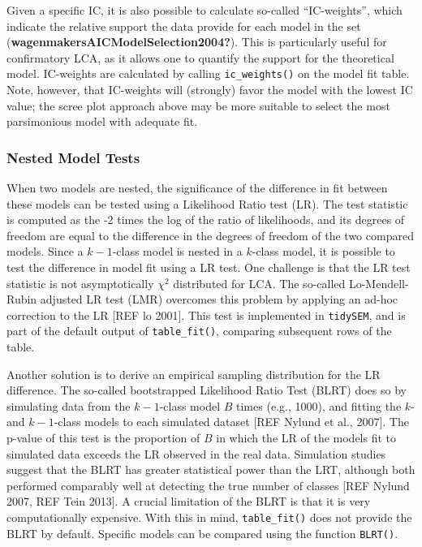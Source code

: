 \documentclass[
  ,man,floatsintext]{apa6}
\begin{document}
Given a specific IC, it is also possible to calculate so-called
``IC-weights'', which indicate the relative support the data provide for
each model in the set (\textbf{wagenmakersAICModelSelection2004?}). This is
particularly useful for confirmatory LCA, as it allows one to quantify
the support for the theoretical model. IC-weights are calculated by
calling \texttt{ic\_weights()} on the model fit table. Note, however, that
IC-weights will (strongly) favor the model with the lowest IC value; the
scree plot approach above may be more suitable to select the most
parsimonious model with adequate fit.

\hypertarget{nested-model-tests}{%
\subsubsection{Nested Model Tests}\label{nested-model-tests}}

When two models are nested, the significance of the difference in fit
between these models can be tested using a Likelihood Ratio test (LR).
The test statistic is computed as the -2 times the log of the ratio of
likelihoods, and its degrees of freedom are equal to the difference in
the degrees of freedom of the two compared models. Since a \(k-1\)-class
model is nested in a \(k\)-class model, it is possible to test the
difference in model fit using a LR test. One challenge is that the LR
test statistic is not asymptotically \(\chi^2\) distributed for LCA. The
so-called Lo-Mendell-Rubin adjusted LR test (LMR) overcomes this problem
by applying an ad-hoc correction to the LR {[}REF lo 2001{]}. This test is
implemented in \texttt{tidySEM}, and is part of the default output of
\texttt{table\_fit()}, comparing subsequent rows of the table.

Another solution is to derive an empirical sampling distribution for the
LR difference. The so-called bootstrapped Likelihood Ratio Test (BLRT)
does so by simulating data from the \(k-1\)-class model \(B\) times (e.g.,
1000), and fitting the \(k\)- and \(k-1\)-class models to each simulated
dataset {[}REF Nylund et al., 2007{]}. The p-value of this test is the
proportion of \(B\) in which the LR of the models fit to simulated data
exceeds the LR observed in the real data. Simulation studies suggest
that the BLRT has greater statistical power than the LRT, although both
performed comparably well at detecting the true number of classes {[}REF
Nylund 2007, REF Tein 2013{]}. A crucial limitation of the BLRT is that it
is very computationally expensive. With this in mind, \texttt{table\_fit()} does
not provide the BLRT by default. Specific models can be compared using
the function \texttt{BLRT()}.
\end{document}

